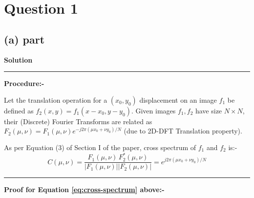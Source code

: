 \documentclass[a4paper,12pt]{article}
\title{\cooltitle{CS663 Assignment-5}}
\author{{\bf Saksham Rathi, Kavya Gupta, Shravan Srinivasa Raghavan} \\
\small Department of Computer Science, \\
Indian Institute of Technology Bombay \\}
\date{}
\newenvironment{solution}[2][]{%
\begin{mdframed}[linecolor=blue!70!black, linewidth=2pt, roundcorner=10pt, backgroundcolor=yellow!10!white, skipabove=12pt, skipbelow=12pt]%
	\textbf{\large #2}
	\par\noindent\rule{\textwidth}{0.4pt}
}{
\end{mdframed}
}
\begin{document}
\maketitle

\section*{Question 1}
\subsection*{(a) part}
\begin{solution}{Solution}
\textbf{\Large Procedure:-}

Let the translation operation for a $(x_0, y_0)$ displacement on an image $f_1$ be defined as $f_2(x, y) = f_1(x - x_0, y - y_0)$. Given images $f_1, f_2$ have size $N \times N$, their (Discrete) Fourier Transforms are related as $F_2(\mu, \nu) = F_1(\mu, \nu) e^{-j2\pi (\mu x_0 + \nu y_0)/N}$ (due to 2D-DFT Translation property).

As per Equation (3) of Section I of the paper, cross spectrum of $f_1$ and $f_2$ is:-
\begin{equation}
	C(\mu, \nu) = \frac{F_1(\mu, \nu) \, F_2^{*}(\mu, \nu)}{|F_1(\mu, \nu)||F_2(\mu, \nu)|} = e^{j2\pi (\mu x_0 + \nu y_0)/N}
	\label{eq:cross-spectrum}
\end{equation}

\hrule
\vspace{5pt}
\textbf{Proof for Equation \ref{eq:cross-spectrum} above:-}


\end{solution}
\end{document}
